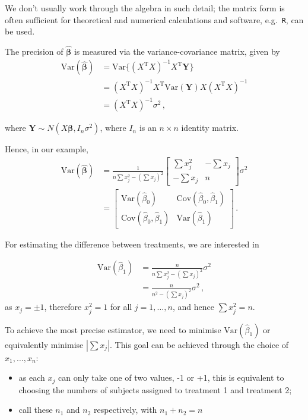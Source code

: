 \documentclass[
]{book}
\providecommand{\tightlist}{%
  \setlength{\itemsep}{0pt}\setlength{\parskip}{0pt}}
\theoremstyle{definition}
\theoremstyle{definition}
\theoremstyle{definition}
\theoremstyle{definition}
\theoremstyle{remark}
\begin{document}
We don't usually work through the algebra in such detail; the matrix form is often sufficient for theoretical and numerical calculations and software, e.g.~\texttt{R}, can be used.

The precision of \(\hat{\boldsymbol{\beta}}\) is measured via the variance-covariance matrix, given by
\begin{align}
\textrm{Var}(\hat{\boldsymbol{\beta}}) & = \textrm{Var}\{(X^{\textrm{T}}X)^{-1}X^{\textrm{T}}\boldsymbol{Y}\}\\
& =(X^{\textrm{T}}X)^{-1}X^{\textrm{T}}\textrm{Var}(\boldsymbol{Y})X(X^{\textrm{T}}X)^{-1}\\
& = (X^{\textrm{T}}X)^{-1}\sigma^{2}\,,
\end{align}

where \(\boldsymbol{Y}\sim N(X\boldsymbol{\beta},I_n\sigma^{2})\), where \(I_n\) is an \(n\times n\) identity matrix.

Hence, in our example,
\begin{align*}
\textrm{Var}(\hat{\boldsymbol{\beta}}) & = \frac{1}{n\sum x_j^{2}-(\sum x_j)^{2}}\left[\begin{array}{cc}
\sum x_j^{2}&-\sum x_j\\
-\sum x_j&n\end{array}\right]\sigma^{2}\\
& = \left[\begin{array}{cc}
\textrm{Var}(\hat\beta_{0})&\textrm{Cov}(\hat\beta_{0},\hat\beta_{1})\\
\textrm{Cov}(\hat\beta_{0},\hat\beta_{1})&\textrm{Var}(\hat\beta_{1})\end{array}\right]\,.
\end{align*}

For estimating the difference between treatments, we are interested in

\begin{align*}
\textrm{Var}(\hat{\beta}_{1})& = \frac{n}{n\sum x_j^{2}-(\sum x_j)^{2}}\sigma^{2}\\
 & = \frac{n}{n^2 - (\sum x_j)^2}\sigma^{2}\,,
\end{align*}
as \(x_j=\pm 1\), therefore \(x_j^2=1\) for all \(j=1,\ldots,n\), and hence \(\sum x_j^2=n\).

To achieve the most precise estimator, we need to minimise \(\textrm{Var}(\hat{\beta}_{1})\) or equivalently minimise \(|\sum x_j|\). This goal can be achieved through the choice of \(x_{1},\dots,x_{n}\):

\begin{itemize}
\tightlist
\item
  as each \(x_j\) can only take one of two values, -1 or +1, this is equivalent to choosing the numbers of subjects assigned to treatment 1 and treatment 2;
\item
  call these \(n_{1}\) and \(n_{2}\) respectively, with \(n_{1}+n_{2}=n\)
\end{itemize}
\end{document}
